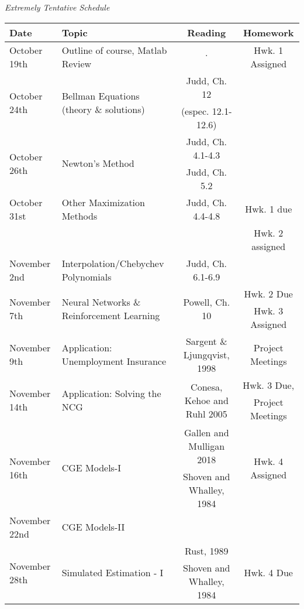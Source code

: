 \documentclass[a4paper]{article}
\begin{document}
\clearpage
\emph{Extremely Tentative Schedule}
\begin{table}[ht!]
\centering
\begin{tabular}{|l|l|c|c|}
\hline
Date & Topic & Reading & Homework \\
\hline
\multirow{2}{*}{October 19th} &  \multirow{2}{*}{Outline of course, Matlab Review}  & \multirow{2}{*}{$\cdot$} & \multirow{2}{*}{Hwk. 1 Assigned} \\
 &    &  & \\
\hline
\multirow{2}{*}{October 24th} & \multirow{2}{*}{Bellman Equations (theory \& solutions)} &  Judd, Ch. 12 &  \\
 & & (espec. 12.1-12.6) & \\
\hline
\multirow{2}{*}{October 26th} & \multirow{2}{*}{Newton's Method} &  Judd, Ch. 4.1-4.3 &  \\
 &  &  Judd, Ch. 5.2 & \\
\hline
October 31st & Other Maximization Methods & Judd, Ch. 4.4-4.8  & Hwk. 1 due\\ 
 & & & Hwk. 2 assigned\\
\hline
November 2nd & Interpolation/Chebychev Polynomials & Judd, Ch. 6.1-6.9  & \\
\hline
\multirow{2}{*}{November 7th} &  \multirow{2}{*}{Neural Networks \& Reinforcement Learning} & \multirow{2}{*}{Powell, Ch. 10} & Hwk. 2 Due \\
 &     &  &  Hwk. 3 Assigned\\
\hline
\multirow{2}{*}{November 9th} & \multirow{2}{*}{Application: Unemployment Insurance} & \multirow{2}{*}{Sargent \& Ljungqvist, 1998}  & \multirow{2}{*}{Project Meetings} \\
 &  &  &  \\
\hline
\multirow{2}{*}{November 14th} & \multirow{2}{*}{Application: Solving the NCG} & \multirow{2}{*}{Conesa, Kehoe and Ruhl 2005} & Hwk. 3 Due, \\
 &  &  & Project Meetings \\
 \hline
 \multirow{2}{*}{November 16th} & \multirow{2}{*}{CGE Models-I }& Gallen and Mulligan 2018 & \multirow{2}{*}{Hwk. 4 Assigned}\\
 &  & Shoven and Whalley, 1984 & \\
 \hline
 November 22nd  & CGE Models-II &  & \\
 \hline
 \multirow{2}{*}{November 28th} & \multirow{2}{*}{Simulated Estimation - I } & Rust, 1989 & \multirow{2}{*}{Hwk. 4 Due}\\
 &  & Shoven and Whalley, 1984 & \\

\end{tabular}
\end{table}
\end{document}
